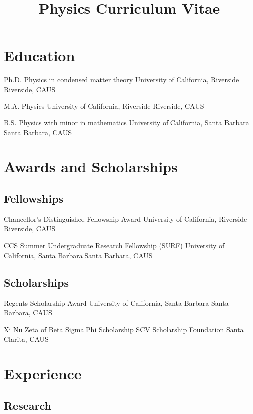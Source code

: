 \documentclass[12pt,letter]{moderncv}
\title{Physics Curriculum Vitae}
\begin{document}
  \maketitle

  \section{Education}

    {Ph.D. Physics in condensed matter theory}
    {University of California, Riverside}
    {Riverside, CA}{US}{}

    {M.A. Physics}
    {University of California, Riverside}
    {Riverside, CA}{US}{}

    {B.S. Physics with minor in mathematics}
    {University of California, Santa Barbara}
    {Santa Barbara, CA}{US}{}

  \section{Awards and Scholarships}

  \subsection{Fellowships}

    {Chancellor's Distinguished Fellowship Award}
    {University of California, Riverside}
    {Riverside, CA}{US}{}

    {CCS Summer Undergraduate Research Fellowship (SURF)}
    {University of California, Santa Barbara}
    {Santa Barbara, CA}{US}{}

  \subsection{Scholarships}

    {Regents Scholarship Award}
    {University of California, Santa Barbara}
    {Santa Barbara, CA}{US}{}

    {Xi Nu Zeta of Beta Sigma Phi Scholarship}
    {SCV Scholarship Foundation}
    {Santa Clarita, CA}{US}{}

  \section{Experience}

  \subsection{Research}
\end{document}
